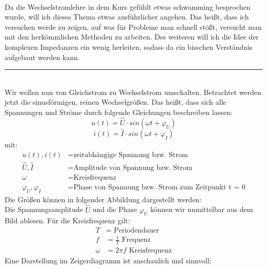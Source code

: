 \documentclass{article}
\begin{document}
\begin{mdframed}
\centering
\vspace{0.2\baselineskip}
\\
\vspace{0.5\baselineskip}
\justify
Da die Wechselstromlehre in dem Kurs gefühlt etwas schwamming besprochen wurde, will ich dieses Thema etwas ausführlicher angehen. Das heißt, dass ich versuchen werde zu zeigen, auf was für Probleme man schnell stößt, versucht man mit den herkömmlichen Methoden zu arbeiten. Des weiteren will ich die Idee der komplexen Impedanzen ein wenig herleiten, sodass da ein bisschen Verständnis aufgebaut werden kann.
\justify
\centering
\rule{0.6\textwidth}{0.5pt}\\
\justify
\indent Wir wollen nun von Gleichstrom zu Wechselstrom umschalten. Betrachtet werden jetzt die sinusförmigen, reinen Wechselgrößen. Das heißt, dass sich alle Spannungen und Ströme durch folgende Gleichungen beschreiben lassen:
\[u(t) = \hat{U} \cdot sin(\omega t + \varphi_U)\]
\[i(t) = \hat{I} \cdot sin(\omega t + \varphi_I)\]
mit:
\begin{align*}
    u(t),i(t) &= \text{zeitabhängige Spannung bzw. Strom}\\
    \hat{U},\hat{I} &= \text{Amplitude von Spannung bzw. Strom}\\
    \omega &= \text{Kreisfrequenz}\\
    \varphi_U,\varphi_I &= \text{Phase von Spannung bzw. Strom zum Zeitpunkt t = 0}
\end{align*}
\flushleft Die Größen können in folgender Abbildung dargestellt werden:\\
\vspace{1\baselineskip}
\centering
\raisebox{-0.5\height}{}
\vspace{1\baselineskip}
\justify
Die Spannungsamplitude $\hat{U}$ und die Phase $\varphi_U$ können wir unmittelbar aus dem Bild ablesen. Für die Kreisfrequenz gilt:
\begin{align*}
    T &= \text{ Periodendauer}\\
    f &= \frac{1}{T} \text{ Frequenz}\\
    \omega &= 2\pi f \text{ Kreisfrequenz}
\end{align*}
\flushleft Eine Darstellung im Zeigerdiagramm ist anschaulich und sinnvoll:\\
\centering
\vspace{1\baselineskip}
\raisebox{-0.5\height}{}\\

\end{mdframed}
\end{document}
